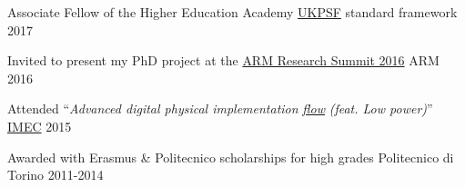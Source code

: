 \vspace{-0.3mm}
\begin{cvhonors}

\cvhonor
{Associate Fellow of the Higher Education Academy} %
{{\color{myblue}\href{https://www.heacademy.ac.uk/ukpsf}{UKPSF}} standard 
framework} %
{} %
{2017} %

\cvhonor
{Invited to present my PhD project at the 
{\color{myblue}\href{https://developer.arm.com/research/summit/previous-summits/2016/speakers}{ARM
 Research Summit 2016}}}
{ARM}
{}
{2016}

\cvhonor
{Attended ``\textit{Advanced digital physical implementation}
{\color{myblue}\href{http://www.europractice.stfc.ac.uk/training/training_flyers/adpi20171024.pdf}{\textit{flow}}}
 \textit{(feat. Low power)}''}
{\color{myblue}\href{https://www.imec-int.com/en/about-us}{IMEC}}
{}
{2015}

\cvhonor
{Awarded with Erasmus \& Politecnico scholarships for high grades}
{Politecnico di Torino}
{}
{2011-2014}


\end{cvhonors}